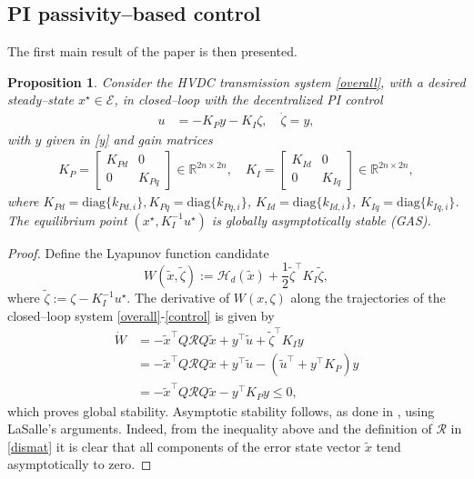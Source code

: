 \documentclass[5p,twocolumn]{elsarticle}
\def\lab{\label}
\newtheorem{proposition}[theorem]{Proposition}
\numberwithin{equation}{section}
\begin{document}
\subsection{PI passivity--based control}
\label{PBCcontrol}
The first main result of the paper is then presented. \smallbreak
\begin{proposition}\em
\lab{pro2}
Consider the HVDC transmission system \eqref{overall}, with a desired steady--state $x^\star  \in\mathcal{E}$, in closed--loop with the decentralized PI control
\begin{equation}\label{control}
\begin{aligned}
u & = -K_P y - K_I\zeta,\quad \dot \zeta = y,
\end{aligned}
\end{equation}
with $y$ given in \eqref{y} and gain matrices
\begin{equation}
\begin{aligned}\label{gains}
K_P=\begin{bmatrix}
K_{Pd}&0\\
0&K_{Pq}
\end{bmatrix}\in\mathbb{R}^{2n\times 2n},\quad 
K_I=\begin{bmatrix}
K_{Id}&0\\
0&K_{Iq}
\end{bmatrix}\in\mathbb{R}^{2n\times 2n},
\end{aligned}
\end{equation}
where $K_{Pd} =\mathrm{diag}\{k_{Pd,i}\}, K_{Pq}=\mathrm{diag}\{k_{Pq,i}\}$, $K_{Id} =\mathrm{diag}\{k_{Id,i}\}$, $K_{Iq}=\mathrm{diag}\{k_{Iq,i}\}$. The equilibrium point $(x^\star ,K_I^{-1}u^\star )$ is globally asymptotically stable (GAS).
\end{proposition}
\begin{proof}
Define the Lyapunov function candidate
\begin{equation}\label{weq}
W(\tilde x,\tilde \zeta):=\mathcal{H}_d(\tilde x)+\frac{1}{2}\tilde\zeta^\top K_I\tilde\zeta,
\end{equation}
where $
\tilde \zeta:=\zeta - K_I^{-1}u^\star .
$
The derivative of $W(x,\zeta)$ along the trajectories of the closed--loop system \eqref{overall}-\eqref{control} is given by
\begin{equation*}
\begin{aligned}
\dot{{W}}&=-\tilde x^\top Q\mathcal{R}Q\tilde x+{y}^\top\tilde{u}+\tilde\zeta^\top K_Iy\\
&=-\tilde x^\top Q\mathcal{R}Q\tilde x+{y}^\top\tilde{u}-(\tilde u^\top +y^\top K_P)y \\
& =  -\tilde x^\top Q\mathcal{R}Q\tilde x- {y}^\top K_P {y\leq 0},
\end{aligned}
\end{equation*}
which proves global stability. Asymptotic stability follows, as done in \cite{HERetal}, using LaSalle's arguments. Indeed, from the inequality above and the definition of $\mathcal{R}$ in \eqref{dismat} it is clear
that all components of the error state vector $\tilde x$ tend asymptotically to zero.
\end{proof}
\end{document}
